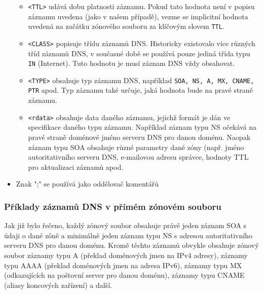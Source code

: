 \begin{itemize}
\begin{itemize}
    \item \verb|<TTL>| udává dobu platnosti záznamu. Pokud tato hodnota není v popisu záznamu uvedena (jako v našem případě), vezme se implicitní hodnota uvedená na začátku zónového souboru za klíčovým slovem {\tt TTL}.
    \item \verb|<CLASS>| popisuje třídu záznamů DNS. Historicky existovalo více různých tříd záznamů DNS, v současné době se používá pouze jediná třída typu {\tt IN} (Internet). Tuto hodnotu je musí záznam DNS vždy obsahovat.
    \item \verb|<TYPE>| obsahuje typ záznamu DNS, například {\tt SOA, NS, A, MX, CNAME, PTR} apod. Typ záznamu také určuje, jaká hodnota bude na pravé straně záznamu.
    \item \verb|<rdata>| obsahuje data daného záznamu, jejichž formát je dán ve specifikace daného typu záznamu. Například záznam typu NS očekává na pravé straně doménové jméno serveru DNS pro danou doménu. Naopak záznam typu SOA obsahuje různé parametry dané zóny (např. jméno autoritativního serveru DNS, e-mailovou adresu správce, hodnoty TTL pro aktualizaci záznamů apod.
  \end{itemize}
  \item Znak ";" se používá jako oddělovač komentářů
\end{itemize}

\subsubsection{Příklady záznamů DNS v přímém zónovém souboru}
Jak již bylo řečeno, každý zónový soubor obsahuje právě jeden záznam SOA s údaji o dané zóně a minimálně jeden záznam typu NS s adresou autoritativního serveru DNS pro danou doménu. Kromě těchto záznamů obvykle obsahuje zónový soubor záznamy typu A (překlad doménových jmen na IPv4 adresy), záznamy typu AAAA (překlad doménových jmen na adresa IPv6), záznamy typu MX (odkazujících na poštovní server pro danou doménu), záznamy typu CNAME (aliasy koncových zařízení) a další. 

